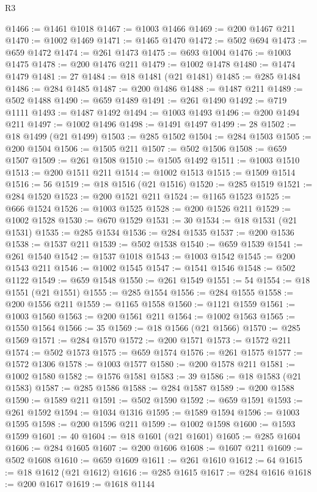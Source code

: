 \begin{lexlean}{R3}
\begin{coremodule}
@1466 := @1461 @1018
@1467 := @1003 @1466
@1469 := @200 @1467 @211
@1470 := @1002 @1469
@1471 := @1465 @1470
@1472 := @502 @694
@1473 := @659 @1472
@1474 := @261 @1473
@1475 := @693 @1004
@1476 := @1003 @1475
@1478 := @200 @1476 @211
@1479 := @1002 @1478
@1480 := @1474 @1479
@1481 := 27
@1484 := @18 @1481 (@21 @1481)
@1485 := @285 @1484
@1486 := @284 @1485
@1487 := @200 @1486
@1488 := @1487 @211
@1489 := @502 @1488
@1490 := @659 @1489
@1491 := @261 @1490
@1492 := @719 @1111
@1493 := @1487 @1492
@1494 := @1003 @1493
@1496 := @200 @1494 @211
@1497 := @1002 @1496
@1498 := @1491 @1497
@1499 := 28
@1502 := @18 @1499 (@21 @1499)
@1503 := @285 @1502
@1504 := @284 @1503
@1505 := @200 @1504
@1506 := @1505 @211
@1507 := @502 @1506
@1508 := @659 @1507
@1509 := @261 @1508
@1510 := @1505 @1492
@1511 := @1003 @1510
@1513 := @200 @1511 @211
@1514 := @1002 @1513
@1515 := @1509 @1514
@1516 := 56
@1519 := @18 @1516 (@21 @1516)
@1520 := @285 @1519
@1521 := @284 @1520
@1523 := @200 @1521 @211
@1524 := @1165 @1523
@1525 := @666 @1524
@1526 := @1003 @1525
@1528 := @200 @1526 @211
@1529 := @1002 @1528
@1530 := @670 @1529
@1531 := 30
@1534 := @18 @1531 (@21 @1531)
@1535 := @285 @1534
@1536 := @284 @1535
@1537 := @200 @1536
@1538 := @1537 @211
@1539 := @502 @1538
@1540 := @659 @1539
@1541 := @261 @1540
@1542 := @1537 @1018
@1543 := @1003 @1542
@1545 := @200 @1543 @211
@1546 := @1002 @1545
@1547 := @1541 @1546
@1548 := @502 @1122
@1549 := @659 @1548
@1550 := @261 @1549
@1551 := 54
@1554 := @18 @1551 (@21 @1551)
@1555 := @285 @1554
@1556 := @284 @1555
@1558 := @200 @1556 @211
@1559 := @1165 @1558
@1560 := @1121 @1559
@1561 := @1003 @1560
@1563 := @200 @1561 @211
@1564 := @1002 @1563
@1565 := @1550 @1564
@1566 := 35
@1569 := @18 @1566 (@21 @1566)
@1570 := @285 @1569
@1571 := @284 @1570
@1572 := @200 @1571
@1573 := @1572 @211
@1574 := @502 @1573
@1575 := @659 @1574
@1576 := @261 @1575
@1577 := @1572 @1306
@1578 := @1003 @1577
@1580 := @200 @1578 @211
@1581 := @1002 @1580
@1582 := @1576 @1581
@1583 := 39
@1586 := @18 @1583 (@21 @1583)
@1587 := @285 @1586
@1588 := @284 @1587
@1589 := @200 @1588
@1590 := @1589 @211
@1591 := @502 @1590
@1592 := @659 @1591
@1593 := @261 @1592
@1594 := @1034 @1316
@1595 := @1589 @1594
@1596 := @1003 @1595
@1598 := @200 @1596 @211
@1599 := @1002 @1598
@1600 := @1593 @1599
@1601 := 40
@1604 := @18 @1601 (@21 @1601)
@1605 := @285 @1604
@1606 := @284 @1605
@1607 := @200 @1606
@1608 := @1607 @211
@1609 := @502 @1608
@1610 := @659 @1609
@1611 := @261 @1610
@1612 := 64
@1615 := @18 @1612 (@21 @1612)
@1616 := @285 @1615
@1617 := @284 @1616
@1618 := @200 @1617
@1619 := @1618 @1144

\end{coremodule}
\end{lexlean}
